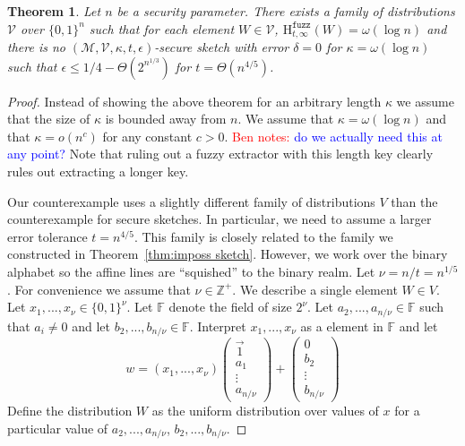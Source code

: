 \documentclass[11pt]{article}
\newcommand{\thref}[1]{\mbox{Theorem~\ref{#1}}}
\newcommand{\zo}{\ensuremath{\{0, 1\}}}
\newcommand{\Hfuzz}{\mathrm{H}^{\mathtt{fuzz}}_{t,\infty}}
\newtheorem{theorem}{Theorem}[section]
\newcommand{\authnote}[2]{{\textcolor{red}{\textsf{#1 notes: }\textcolor{blue}{ #2}}\marginpar{\textcolor{red}{\textbf{!!!!!}}}}}
\newcommand{\authnote}[2]{}
\newcommand{\bnote}[1]{{\authnote{Ben}{#1}}}
\begin{document}
\begin{theorem}
\label{thm:imposs fuzz ext}
Let $n$ be a security parameter.  There exists a family of distributions $\mathcal{V}$ over $\zo^n$ such that for each element $W\in \mathcal{V}$, $\Hfuzz(W)= \omega(\log n)$ and there is no $(\mathcal{M}, \mathcal{V}, \kappa, t, \epsilon)$-secure sketch with error $\delta = 0$ for $\kappa =\omega(\log n)$ such that $\epsilon \le 1/4 - \Theta(2^{n^{1/3}})$ for $t = \Theta(n^{4/5})$. \end{theorem}
\begin{proof}
Instead of showing the above theorem for an arbitrary length $\kappa$ we assume that the size of $\kappa$ is bounded away from $n$.  We assume that $\kappa = \omega(\log n)$ and that $\kappa = o(n^c)$ for any constant $c>0$. \bnote{do we actually need this at any point?} Note that ruling out a fuzzy extractor with this length key clearly rules out extracting a longer key.

Our counterexample uses a slightly different family of distributions $V$ than the counterexample for secure sketches.  In particular, we need to assume a larger error tolerance $t=n^{4/5}$.  This family is closely related to the family we constructed in \thref{thm:imposs sketch}.  However, we work over the binary alphabet so the affine lines are ``squished'' to the binary realm.  Let $\nu = n/t = n^{1/5}$.  For convenience we assume that $\nu\in\mathbb{Z}^+$.  We describe a single element $W\in V$. Let $x_1,..., x_\nu \in \zo^\nu$.  Let $\mathbb{F}$ denote the field of size $2^{\nu}$.  Let $a_2,..., a_{n/\nu}\in\mathbb{F}$ such that $a_i\neq 0$ and let $b_2,..., b_{n/\nu}\in\mathbb{F}$.  
Interpret $x_1,..., x_{\nu}$ as a element in $\mathbb{F}$ and let 
\[w = (x_1,..., x_{\nu})  \begin{pmatrix} \vec{1} \\a_1  \\ \vdots \\ a_{n/\nu} \end{pmatrix} + \begin{pmatrix} 0  \\ 
b_2\\ \vdots \\ b_{n/\nu} \end{pmatrix} 
\]
Define the distribution $W$ as the uniform distribution over values of $x$ for a particular value of $a_2,..., a_{n/\nu}$, $b_2,..., b_{n/\nu}$.  


\end{proof}
\end{document}
